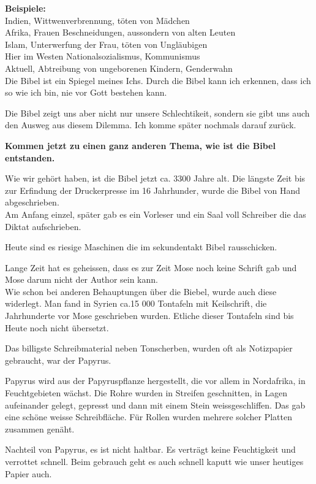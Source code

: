 \documentclass[fontsize=16pt]{mybib}
\begin{document}
\begin{otsblock}
    \textbf{Beispiele:}\\
    Indien, Wittwenverbrennung, töten von Mädchen\\
    Afrika, Frauen Beschneidungen, aussondern von alten Leuten\\
    Islam, Unterwerfung der Frau, töten von Ungläubigen\\
    Hier im Westen Nationalsozialismus, Kommunismus\\
    Aktuell, Abtreibung von ungeborenen Kindern, Genderwahn\\

    Die Bibel ist ein Spiegel meines Ichs. Durch die Bibel kann ich erkennen, dass ich so wie ich bin, nie vor Gott bestehen kann.

    Die Bibel zeigt uns aber nicht nur unsere Schlechtikeit, sondern sie gibt uns auch den Ausweg aus diesem Dilemma. Ich komme später nochmals darauf zurück.

    \textbf{Kommen jetzt zu einen ganz anderen Thema, wie ist die Bibel entstanden.}
\end{otsblock}
\begin{otsblock}    
    Wie wir gehört haben, ist die Bibel jetzt ca. 3300 Jahre alt. Die längste Zeit bis zur Erfindung der Druckerpresse im 16 Jahrhunder, wurde die Bibel von Hand abgeschrieben.\\
    Am Anfang einzel, später gab es ein Vorleser und ein Saal voll Schreiber die das Diktat aufschrieben.

    Heute sind es riesige Maschinen die im sekundentakt Bibel rausschicken. 
\end{otsblock}
\begin{otsblock}
    Lange Zeit hat es geheissen, dass es zur Zeit Mose noch keine Schrift gab und Mose darum nicht der Author sein kann.\\
    Wie schon bei anderen Behauptungen über die Biebel, wurde auch diese widerlegt. Man fand in Syrien ca.15 000 Tontafeln mit Keilschrift, die Jahrhunderte vor Mose geschrieben wurden. Etliche dieser Tontafeln sind bis Heute noch nicht übersetzt.
\end{otsblock}
\begin{otsblock}
    Das billigste Schreibmaterial neben Tonscherben, wurden oft als Notizpapier gebraucht, war der Papyrus. 

    Papyrus wird aus der Papyruspflanze hergestellt, die vor allem in Nordafrika, in Feuchtgebieten wächst. Die Rohre wurden in Streifen geschnitten, in Lagen aufeinander gelegt, gepresst und dann mit einem Stein weissgeschliffen. Das gab eine schöne weisse Schreibfläche. Für Rollen wurden mehrere solcher Platten zusammen genäht.

    Nachteil von Papyrus, es ist nicht haltbar. Es verträgt keine Feuchtigkeit und verrottet schnell. Beim gebrauch geht es auch schnell kaputt wie unser heutiges Papier auch.

\end{otsblock}
\end{document}
